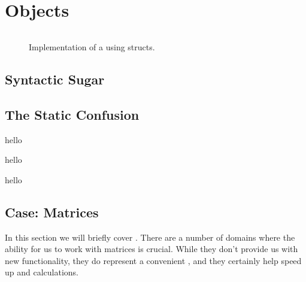\chapter{Objects}


\begin{figure}[tbp]
  \inputminted[fontsize=\footnotesize]{csharp}{../src/csharp/rectangle/Rectangle.cs}
  \caption{Implementation of a  using structs.}
  \label{fig:objects:rectangle:lib}
\end{figure}



\section{Syntactic Sugar}



\section{The Static Confusion}



\csharpsection{\csharp}
hello

hello

hello

\section{Case: Matrices}

In this section we will briefly cover . There are a number of domains where the ability for us to work with matrices is crucial. While they don't provide us with new functionality, they do represent a convenient , and they certainly help speed up  and  calculations.

